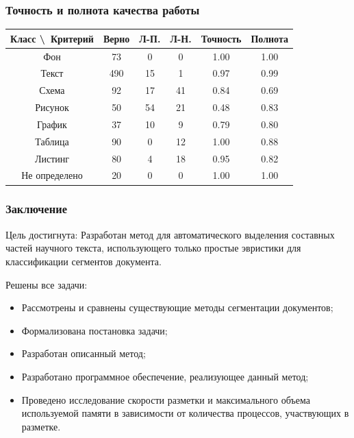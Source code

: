 \documentclass[gray]{beamer}
\begin{document}
\begin{frame}
    \frametitle{Точность и полнота качества работы}

    \begin{table}[H]
        \begin{center}
            \begin{tabular}{|c|c|c|c|c|c|}
                \hline
                \textbf{Класс \textbackslash\ Критерий} & \textbf{Верно} & \textbf{Л-П.} & \textbf{Л-Н.} & Точность & Полнота \\ \hline
                Фон & 73 & 0 & 0 & 1.00 & 1.00 \\ \hline
                Текст & 490 & 15 & 1 & 0.97 & 0.99 \\ \hline
                Схема & 92 & 17 & 41 & 0.84 & 0.69 \\ \hline
                Рисунок & 50 & 54 & 21 & 0.48 & 0.83 \\ \hline
                График & 37 & 10 & 9 & 0.79 & 0.80 \\ \hline
                Таблица & 90 & 0 & 12 & 1.00 & 0.88 \\ \hline
                Листинг & 80 & 4 & 18 & 0.95 & 0.82 \\ \hline
                Не определено & 20 & 0 & 0 & 1.00 & 1.00 \\ \hline
            \end{tabular}
        \end{center}
    \end{table}
\end{frame}

\begin{frame}
    \frametitle{Заключение}

    Цель достигнута: Разработан метод для автоматического выделения составных частей научного текста, использующего только простые эвристики для классификации сегментов документа.

    \vspace{0.2cm}

    Решены все задачи:
    \begin{itemize}
        \item Рассмотрены и сравнены существующие методы сегментации документов;
        \item Формализована постановка задачи;
        \item Разработан описанный метод;
        \item Разработано программное обеспечение, реализующее данный метод;
        \item Проведено исследование скорости разметки и максимального объема используемой памяти в зависимости от количества процессов, участвующих в разметке.
    \end{itemize}
\end{frame}
\end{document}
